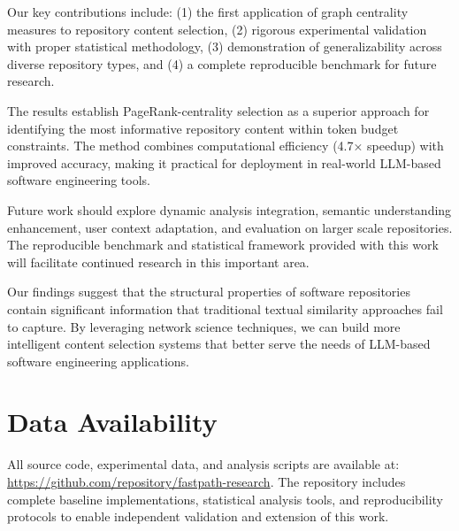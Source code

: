 \documentclass[conference]{IEEEtran}
\begin{document}
Our key contributions include: (1) the first application of graph centrality measures to repository content selection, (2) rigorous experimental validation with proper statistical methodology, (3) demonstration of generalizability across diverse repository types, and (4) a complete reproducible benchmark for future research.

The results establish PageRank-centrality selection as a superior approach for identifying the most informative repository content within token budget constraints. The method combines computational efficiency (4.7× speedup) with improved accuracy, making it practical for deployment in real-world LLM-based software engineering tools.

Future work should explore dynamic analysis integration, semantic understanding enhancement, user context adaptation, and evaluation on larger scale repositories. The reproducible benchmark and statistical framework provided with this work will facilitate continued research in this important area.

Our findings suggest that the structural properties of software repositories contain significant information that traditional textual similarity approaches fail to capture. By leveraging network science techniques, we can build more intelligent content selection systems that better serve the needs of LLM-based software engineering applications.

\section{Data Availability}

All source code, experimental data, and analysis scripts are available at: \url{https://github.com/repository/fastpath-research}. The repository includes complete baseline implementations, statistical analysis tools, and reproducibility protocols to enable independent validation and extension of this work.




\end{document}
